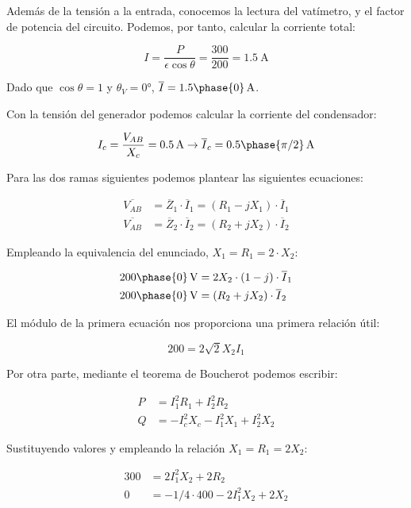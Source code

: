 \documentclass[12pt]{article}
\begin{document}
Además de la tensión a la entrada, conocemos la lectura del vatímetro, y el factor de potencia del circuito. Podemos, por tanto, calcular la corriente total:

\[
I = \frac{P}{\epsilon \cos\theta} = \frac{300}{200} = \SI{1.5}{\ampere}
\]

Dado que $\cos\theta = 1$ y $\theta_V = \ang{0}$, $\overline{I} =  \SI[parse-numbers=false]{1.5\phase{0}}{\ampere}$.

Con la tensión del generador podemos calcular la corriente del condensador:

\[
  I_c = \frac{V_{AB}}{X_c} = \SI{0.5}{\ampere} \rightarrow  \overline{I}_c = \SI[parse-numbers=false]{0.5\phase{\pi/2}}{\ampere}
\]

Para las dos ramas siguientes podemos plantear las siguientes ecuaciones:

\begin{align*}
  \overline{V_{AB}} &= \overline{Z}_1 \cdot \overline{I}_1 = (R_1 - jX_1) \cdot \overline{I}_1\\
  \overline{V_{AB}} &= \overline{Z}_2 \cdot \overline{I}_2 = (R_2 + jX_2) \cdot \overline{I}_2
\end{align*}

Empleando la equivalencia del enunciado, $X_1 = R_1 = 2 \cdot X_2$:

\begin{align*}
   \SI[parse-numbers=false]{200\phase{0}}{\volt} &=  2X_2\cdot (1 - j) \cdot \overline{I}_1\\
   \SI[parse-numbers=false]{200\phase{0}}{\volt} &= (R_2 + jX_2) \cdot \overline{I}_2
\end{align*}

El módulo de la primera ecuación nos proporciona una primera relación útil:

\[
 200 = 2\sqrt{2} X_2 I_1
\]

Por otra parte, mediante el teorema de Boucherot podemos escribir:

\begin{align*}
  P &= I_1^2 R_1 + I_2^2 R_2\\
  Q &= - I_c^2 X_c - I_1^2 X_1+ I_2^2X_2 
\end{align*}

Sustituyendo valores y empleando la relación $X_1 = R_1 = 2X_2$:

\begin{align*}
  300 &= 2I_1^2 X_2 + 2 R_2\\
  0 &= - 1/4 \cdot 400 - 2I_1^2X_2 + 2X_2 
\end{align*}
\end{document}
